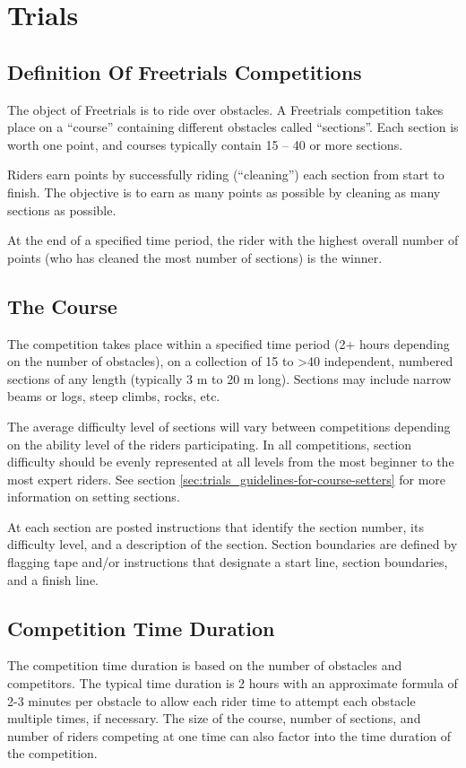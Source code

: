 \chapter{Trials \label{chap:trials}}

\section{Definition Of Freetrials Competitions}
The object of Freetrials is to ride over obstacles. 
A Freetrials competition takes place on a ``course'' containing different obstacles called ``sections''. 
Each section is worth one point, and courses typically contain 15 – 40 or more sections.

Riders earn points by successfully riding (``cleaning'') each section from start to finish. 
The objective is to earn as many points as possible by cleaning as many sections as possible.

At the end of a specified time period, the rider with the highest overall number of points (who has cleaned the most number of sections) is the winner.

\section{The Course}
The competition takes place within a specified time period (2+ hours depending on the number of obstacles), on a collection of 15 to >40 independent, numbered sections of any length (typically 3 m to 20 m long). 
Sections may include narrow beams or logs, steep climbs, rocks, etc.

The average difficulty level of sections will vary between competitions depending on the ability level of the riders participating. 
In all competitions, section difficulty should be evenly represented at all levels from the most beginner to the most expert riders. 
See section \ref{sec:trials_guidelines-for-course-setters} for more information on setting sections.

At each section are posted instructions that identify the section number, its difficulty level, and a description of the section.
Section boundaries are defined by flagging tape and/or instructions that designate a start line, section boundaries, and a finish line.

\section{Competition Time Duration}
The competition time duration is based on the number of obstacles and competitors. 
The typical time duration is 2 hours with an approximate formula of 2-3 minutes per obstacle to allow each rider time to attempt each obstacle multiple times, if necessary. 
The size of the course, number of sections, and number of riders competing at one time can also factor into the time duration of the competition.

